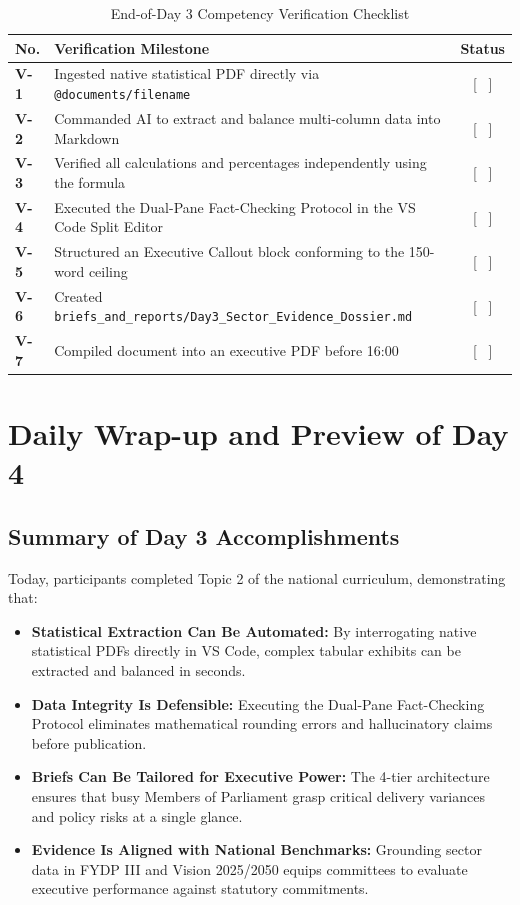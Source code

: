 \documentclass[11pt, a4paper]{report}
\begin{document}
\begin{table}[htbp]
\centering
\caption{End-of-Day 3 Competency Verification Checklist}
\vspace{0.2cm}
\begin{tabular}{@{}>{\bfseries}p{1.2cm}p{10cm}c@{}}
\toprule
No. & Verification Milestone & Status \\
\midrule
V-1 & Ingested native statistical PDF directly via \texttt{@documents/filename} & [ \ ] \\
V-2 & Commanded AI to extract and balance multi-column data into Markdown & [ \ ] \\
V-3 & Verified all calculations and percentages independently using the formula & [ \ ] \\
V-4 & Executed the Dual-Pane Fact-Checking Protocol in the VS Code Split Editor & [ \ ] \\
V-5 & Structured an Executive Callout block conforming to the 150-word ceiling & [ \ ] \\
V-6 & Created \texttt{briefs\_and\_reports/Day3\_Sector\_Evidence\_Dossier.md} & [ \ ] \\
V-7 & Compiled document into an executive PDF before 16:00 & [ \ ] \\
\bottomrule
\end{tabular}
\end{table}

\newpage

\chapter{Daily Wrap-up and Preview of Day 4}

\section{Summary of Day 3 Accomplishments}
Today, participants completed Topic 2 of the national curriculum, demonstrating that:
\begin{itemize}[label=-]
    \item \textbf{Statistical Extraction Can Be Automated:} By interrogating native statistical PDFs directly in VS Code, complex tabular exhibits can be extracted and balanced in seconds.
    \item \textbf{Data Integrity Is Defensible:} Executing the Dual-Pane Fact-Checking Protocol eliminates mathematical rounding errors and hallucinatory claims before publication.
    \item \textbf{Briefs Can Be Tailored for Executive Power:} The 4-tier architecture ensures that busy Members of Parliament grasp critical delivery variances and policy risks at a single glance.
    \item \textbf{Evidence Is Aligned with National Benchmarks:} Grounding sector data in FYDP III and Vision 2025/2050 equips committees to evaluate executive performance against statutory commitments.
\end{itemize}
\end{document}
